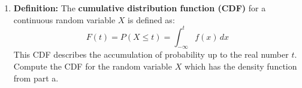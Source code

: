 \documentclass[12pt]{article}
\newif\ifans
\begin{document}
\begin{enumerate}
\begin{enumerate}
\item {\bf Definition:} The {\bf cumulative distribution function (CDF)} for a continuous random variable $X$ is defined as: $$F(t)=P(X \leq t)=\int_{-\infty}^t f(x) \,dx$$  This CDF describes the accumulation of probability up to the real number $t$.  Compute the CDF for the random variable $X$ which has the density function from part a.

\ifans{\fbox{The CDF is $F(t)=\int_{-\infty}^{t}f(x) \,dx=\int_{0}^{t}2e^{-2x} \,dx=1-e^{-2t}$ for $t \geq 0$ and 0 for $t<0$.}} \fi

\end{enumerate}

\end{enumerate}
\end{document}
